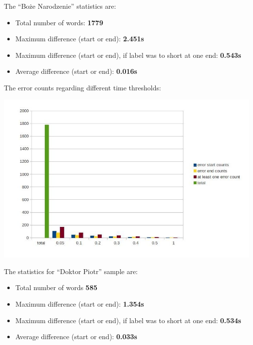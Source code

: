 \documentclass[12pt,a4paper,english]{article}
\begin{document}
The “Boże Narodzenie” statistics are:
\begin{itemize}
    \item Total number of words:				\textbf{1779}
    \item Maximum difference (start or end): 			\textbf{2.451s}
    \item Maximum difference (start or end), if label was to short at one end: 			\textbf{0.543s}
    \item Average difference  (start or end):			\textbf{0.016s}
\end{itemize}
The error counts regarding different time thresholds:
\begin{center}
    \includegraphics[scale=0.7]{boze_narodzenie_word_russian_results.jpg}
\end{center}

\newpage

The statistics for “Doktor Piotr” sample are:
\begin{itemize}
    \item Total number of words				\textbf{585}
    \item Maximum difference (start or end): 			\textbf{1.354s}
    \item Maximum difference (start or end), if label was to short at one end: 			\textbf{0.534s}
    \item Average difference  (start or end):			\textbf{0.033s}
\end{itemize}
\end{document}
